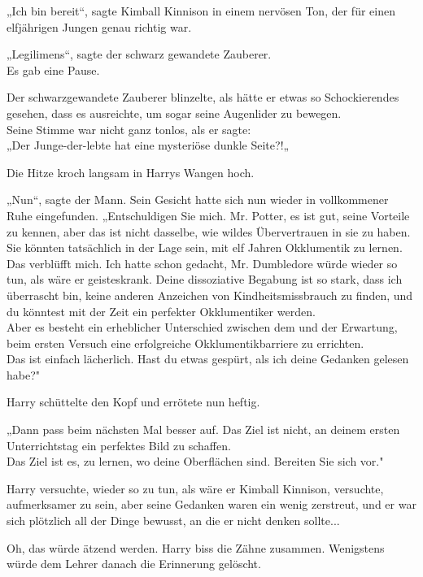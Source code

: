 {„Ich bin bereit“, sagte Kimball Kinnison in einem nervösen Ton, der für einen elfjährigen Jungen genau richtig war.

„Legilimens“, sagte der schwarz gewandete Zauberer.\\ Es gab eine Pause.

Der schwarzgewandete Zauberer blinzelte, als hätte er etwas so Schockierendes gesehen, dass es ausreichte, um sogar seine Augenlider zu bewegen.\\ Seine Stimme war nicht ganz tonlos, als er sagte:\\ „Der Junge-der-lebte hat eine mysteriöse dunkle Seite?!„

Die Hitze kroch langsam in Harrys Wangen hoch.

„Nun“, sagte der Mann. Sein Gesicht hatte sich nun wieder in vollkommener Ruhe eingefunden. „Entschuldigen Sie mich. Mr. Potter, es ist gut, seine Vorteile zu kennen, aber das ist nicht dasselbe, wie wildes Übervertrauen in sie zu haben.\\ Sie könnten tatsächlich in der Lage sein, mit elf Jahren Okklumentik zu lernen. Das verblüfft mich. Ich hatte schon gedacht, Mr. Dumbledore würde wieder so tun, als wäre er geisteskrank. Deine dissoziative Begabung ist so stark, dass ich überrascht bin, keine anderen Anzeichen von Kindheitsmissbrauch zu finden, und du könntest mit der Zeit ein perfekter Okklumentiker werden.\\ Aber es besteht ein erheblicher Unterschied zwischen dem und der Erwartung, beim ersten Versuch eine erfolgreiche Okklumentikbarriere zu errichten.\\ Das ist einfach lächerlich. Hast du etwas gespürt, als ich deine Gedanken gelesen habe?"

Harry schüttelte den Kopf und errötete nun heftig.

„Dann pass beim nächsten Mal besser auf. Das Ziel ist nicht, an deinem ersten Unterrichtstag ein perfektes Bild zu schaffen.\\ Das Ziel ist es, zu lernen, wo deine Oberflächen sind. Bereiten Sie sich vor."

Harry versuchte, wieder so zu tun, als wäre er Kimball Kinnison, versuchte, aufmerksamer zu sein, aber seine Gedanken waren ein wenig zerstreut, und er war sich plötzlich all der Dinge bewusst, an die er nicht denken sollte...

Oh, das würde ätzend werden. Harry biss die Zähne zusammen. Wenigstens würde dem Lehrer danach die Erinnerung gelöscht.

}

